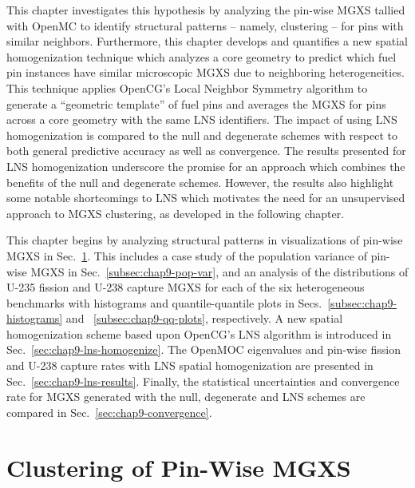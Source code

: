 This chapter investigates this hypothesis by analyzing the pin-wise \ac{MGXS} tallied with OpenMC to identify structural patterns -- namely, clustering -- for pins with similar neighbors. Furthermore, this chapter develops and quantifies a new spatial homogenization technique which analyzes a core geometry to predict which fuel pin instances have similar microscopic \ac{MGXS} due to neighboring heterogeneities. This technique applies OpenCG's Local Neighbor Symmetry algorithm to generate a ``geometric template'' of fuel pins and averages the \ac{MGXS} for pins across a core geometry with the same \ac{LNS} identifiers. The impact of using \ac{LNS} homogenization is compared to the null and degenerate schemes with respect to both general predictive accuracy as well as convergence. The results presented for \ac{LNS} homogenization underscore the promise for an approach which combines the benefits of the null and degenerate schemes. However, the results also highlight some notable shortcomings to \ac{LNS} which motivates the need for an unsupervised approach to \ac{MGXS} clustering, as developed in the following chapter.

This chapter begins by analyzing structural patterns in visualizations of pin-wise \ac{MGXS} in Sec.~\ref{sec:chap9-clustering}. This includes a case study of the population variance of pin-wise \ac{MGXS} in Sec.~\ref{subsec:chap9-pop-var}, and an analysis of the distributions of U-235 fission and U-238 capture \ac{MGXS} for each of the six heterogeneous benchmarks with histograms and quantile-quantile plots in Secs.~\ref{subsec:chap9-histograms} and ~\ref{subsec:chap9-qq-plots}, respectively. A new spatial homogenization scheme based upon OpenCG's \ac{LNS} algorithm is introduced in Sec.~\ref{sec:chap9-lns-homogenize}. The OpenMOC eigenvalues and pin-wise fission and U-238 capture rates with \ac{LNS} spatial homogenization are presented in Sec.~\ref{sec:chap9-lns-results}. Finally, the statistical uncertainties and convergence rate for \ac{MGXS} generated with the null, degenerate and \ac{LNS} schemes are compared in Sec.~\ref{sec:chap9-convergence}.


\section{Clustering of Pin-Wise MGXS}
\label{sec:chap9-clustering}


